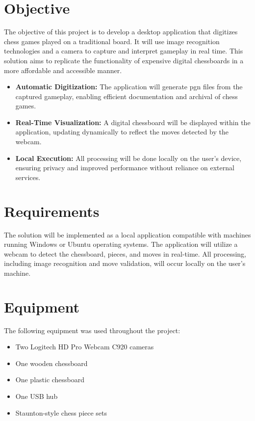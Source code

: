 \section{Objective}

The objective of this project is to develop a desktop application that digitizes chess games played on a traditional board. It will use image recognition technologies and a camera to capture and interpret gameplay in real time. This solution aims to replicate the functionality of expensive digital chessboards in a more affordable and accessible manner.

\begin{itemize}
    \item \textbf{Automatic Digitization:} The application will generate \gls{pgn} files from the captured gameplay, enabling efficient documentation and archival of chess games.

    \item \textbf{Real-Time Visualization:} A digital chessboard will be displayed within the application, updating dynamically to reflect the moves detected by the webcam.

    \item \textbf{Local Execution:} All processing will be done locally on the user’s device, ensuring privacy and improved performance without reliance on external
    services.
\end{itemize}

\section{Requirements}

The solution will be implemented as a local application compatible with machines running Windows or Ubuntu operating systems. The application will utilize a webcam to detect the chessboard, pieces, and moves in real-time. All processing, including image recognition and move validation, will occur locally on the user's machine.

\section{Equipment}
The following equipment was used throughout the project:

\begin{itemize}
    \item Two Logitech HD Pro Webcam C920 cameras
    \item One wooden chessboard
    \item One plastic chessboard
    \item One USB hub
    \item Staunton-style chess piece sets
\end{itemize}


